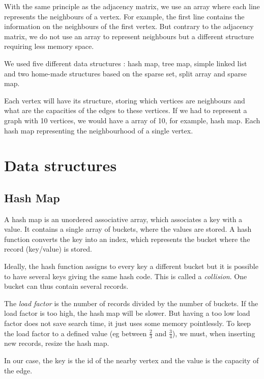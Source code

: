 With the same principle as the adjacency matrix, we use an array where each line represents the neighbours of a vertex. For example, the first line contains the information on the neighbours of the first vertex. But contrary to the adjacency matrix, we do not use an array to represent neighbours but a different structure requiring less memory space. \newline

We used five different data structures : hash map, tree map, simple linked list and two home-made structures based on the sparse set, split array and sparse map. 

Each vertex will have its structure, storing which vertices are neighbours and what are the capacities of the edges to these vertices. If we had to represent a graph with 10 vertices, we would have a array of 10, for example, hash map. Each hash map representing the neighbourhood of a single vertex.

\section{Data structures}
\subsection{Hash Map}
A hash map is an unordered associative array, which associates a key with a value. It contains a single array of buckets, where the values are stored. A hash function converts the key into an index, which represents the bucket where the record (key/value) is stored. \newline

Ideally, the hash function assigns to every key a different bucket but it is possible to have several keys giving the same hash code. This is called a \textit{collision}. One bucket can thus contain several records. \newline

The \textit{load factor} is the number of records divided by the number of buckets.  If the load factor is too high, the hash map will be slower. But having a too low load factor does not save search time, it just uses some memory pointlessly. To keep the load factor to a defined value (eg between $\frac{2}{3}$ and $\frac{3}{4}$), we must, when inserting new records, resize the hash map. \newline

In our case, the key is the id of the nearby vertex and the value is the capacity of the edge.

